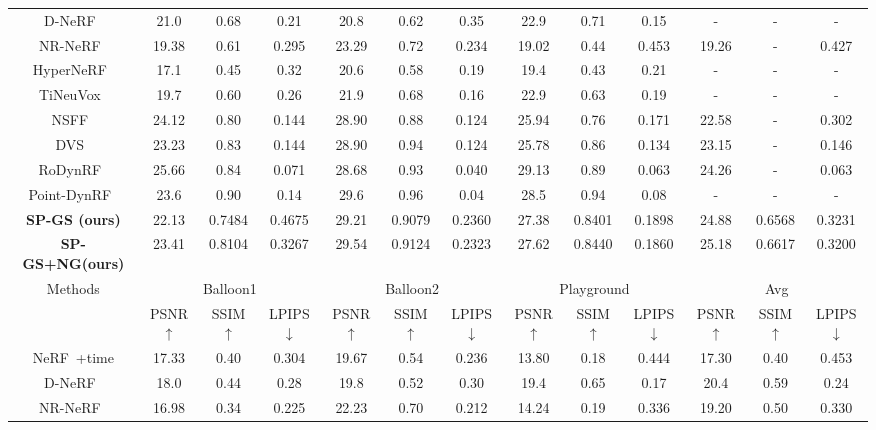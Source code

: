 \begin{table}
{\begin{tabular}{c|*{3}{c}|*{3}{c}|*{3}{c}|*{3}{c}}
    D-NeRF~\cite{D-NeRF} & 21.0 & 0.68 & 0.21 & 20.8 & 0.62 & 0.35 & 22.9 & 0.71 & 0.15   &  -&-&-  \\
    NR-NeRF~\cite{NR-NeRF} & 19.38 & 0.61 & 0.295 & 23.29 & 0.72 & 0.234 & 19.02 & 0.44 & 0.453 & 19.26 & - &0.427   \\
    HyperNeRF~\cite{HyperNeRF} &  17.1 & 0.45 & 0.32 & 20.6 & 0.58 & 0.19  &19.4 & 0.43 & 0.21  &  -&-&- \\
    TiNeuVox~\cite{TiNeuVox} &  19.7 & 0.60 & 0.26 & 21.9 & 0.68 & 0.16 & 22.9 & 0.63 & 0.19   &  -&-&- \\
    NSFF~\cite{NSFF}  &  24.12 & 0.80 & 0.144 & 28.90 & 0.88 & 0.124 & 25.94 & 0.76 & 0.171 & 22.58 & - & 0.302  \\
    DVS~\cite{DVS} &  23.23 & 0.83 & 0.144 & 28.90 & 0.94 & 0.124 & 25.78 & 0.86 & 0.134 & 23.15 & - & 0.146  \\
    RoDynRF~\cite{RoDynRF} &  25.66 & 0.84 & 0.071 & 28.68 & 0.93 & 0.040 & 29.13 & 0.89 & 0.063 & 24.26 & - & 0.063  \\
    Point-DynRF~\cite{Point-DynRF} & 23.6 & 0.90 & 0.14 & 29.6 & 0.96 & 0.04 & 28.5 & 0.94 & 0.08  & -&-&-  \\
    \textbf{SP-GS (ours)}   & 22.13 &0.7484&0.4675 & 29.21 & 0.9079 & 0.2360 & 27.38 &0.8401&0.1898 & 24.88 & 0.6568&0.3231 \\
    \textbf{SP-GS+NG(ours)} & 23.41 &0.8104&0.3267 & 29.54 & 0.9124 & 0.2323 & 27.62 &0.8440&0.1860 & 25.18 & 0.6617&0.3200 \\
     \bottomrule
    \toprule
    \multirow{2}{*}{Methods} 
    &\multicolumn{3}{c|}{ Balloon1} & \multicolumn{3}{c|}{Balloon2} & \multicolumn{3}{c|}{Playground} & \multicolumn{3}{c}{Avg} \\ 
    & \small PSNR$\uparrow$ & \small SSIM$\uparrow$ & \small LPIPS$\downarrow$  
    & \small PSNR$\uparrow$ & \small SSIM$\uparrow$ & \small LPIPS$\downarrow$  
    & \small PSNR$\uparrow$ & \small SSIM$\uparrow$ & \small LPIPS$\downarrow$  
    & \small PSNR$\uparrow$ & \small SSIM$\uparrow$ & \small LPIPS$\downarrow$   \\
    \midrule
NeRF~\cite{NeRF}+time & 17.33 & 0.40 & 0.304    & 19.67 & 0.54 & 0.236 & 13.80 & 0.18 & 0.444 & 17.30 & 0.40 & 0.453 \\
D-NeRF~\cite{D-NeRF} & 18.0 & 0.44 & 0.28 & 19.8 & 0.52 & 0.30 & 19.4 & 0.65 & 0.17 & 20.4 & 0.59 & 0.24 \\
NR-NeRF~\cite{NR-NeRF} & 16.98 & 0.34 & 0.225  & 22.23 & 0.70 & 0.212 & 14.24 & 0.19 & 0.336 & 19.20 & 0.50 & 0.330 \\

\end{tabular}}
\end{table}
